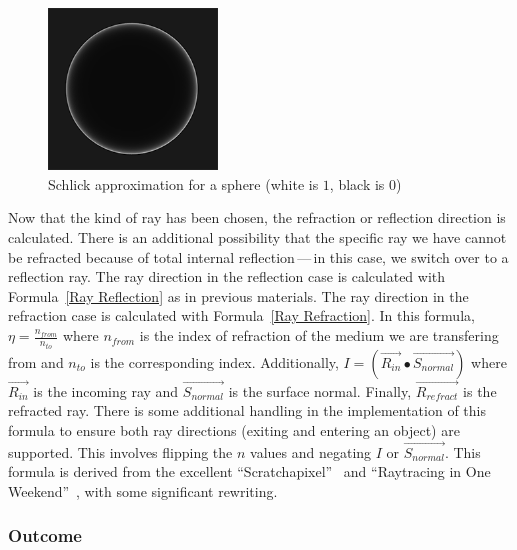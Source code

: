 \vspace{0.3em}
\begin{figure}[htb]
  \centering
  \includegraphics[width=0.4\textwidth]{resources/fresnel}
  \caption{Schlick approximation for a sphere (white is $1$, black is $0$)~\cite{learnopengltheory}}
\label{fig:rayterm-cpu_fresnel}
\end{figure}

Now that the kind of ray has been chosen, the refraction or reflection direction is calculated.
There is an additional possibility that the specific ray we have cannot be refracted because of total internal reflection\,---\,in this case, we switch over to a reflection ray.
The ray direction in the reflection case is calculated with Formula~\ref{Ray Reflection} as in previous materials.
The ray direction in the refraction case is calculated with Formula~\ref{Ray Refraction}.
In this formula, $\eta = \frac{n_{from}}{n_{to}}$ where $n_{from}$ is the index of refraction of the medium we are transfering from and $n_{to}$ is the corresponding index.
Additionally, $I = (\vec{R_{in}} \bullet \vec{S_{normal}})$ where $\vec{R_{in}}$ is the incoming ray and $\vec{S_{normal}}$ is the surface normal.
Finally, $\vec{R_{refract}}$ is the refracted ray.
There is some additional handling in the implementation of this formula to ensure both ray directions (exiting and entering an object) are supported.
This involves flipping the $n$ values and negating $I$ or $\vec{S_{normal}}$.
This formula is derived from the excellent ``Scratchapixel''~\cite{prunier2017shading} and ``Raytracing in One Weekend''~\cite{shirley2016ray}, with some significant rewriting.


\subsubsection{Outcome}
\label{ch:methods:renderer:sequential:outcome}

